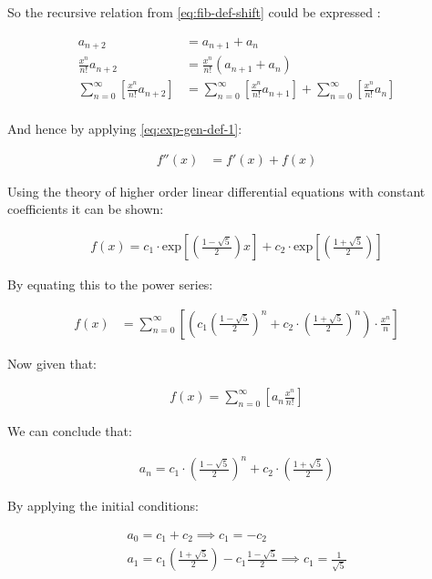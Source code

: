 \documentclass[11pt]{article}
\begin{document}
So the recursive relation from \eqref{eq:fib-def-shift}  could be expressed :


\begin{align*}
a_{n+  2}    &= a_{n+  1} +  a_{n}\\
\frac{x^n}{n!}   a_{n+  2}    &= \frac{x^n}{n!}\left( a_{n+  1} +  a_{n}  \right)\\
\sum^{\infty}_{n= 0} \left[ \frac{x^n}{n!}   a_{n+  2} \right]        &= \sum^{\infty}_{n= 0}   \left[ \frac{x^n}{n!} a_{n+  1} \right]  + \sum^{\infty}_{n= 0}   \left[ \frac{x^n}{n!} a_{n}  \right]  \\
\end{align*}

And hence by applying \eqref{eq:exp-gen-def-1}:

\begin{align}
f''\left( x \right) &= f'\left( x \right)+  f\left( x \right)
\end{align}


Using the theory of higher order linear differential equations with
constant coefficients it can be shown:


\begin{align*}
f\left( x \right)= c_1 \cdot  \mathrm{exp}\left[ \left( \frac{1- \sqrt{5} }{2} \right)x \right] +  c_2 \cdot  \mathrm{exp}\left[ \left( \frac{1 +  \sqrt{5} }{2} \right) \right]
\end{align*}


By equating this to the power series:


\begin{align*}
f\left( x \right)&= \sum^{\infty}_{n= 0}   \left[ \left( c_1\left( \frac{1- \sqrt{5} }{2} \right)^n +  c_2 \cdot  \left( \frac{1+ \sqrt{5} }{2} \right)^n \right) \cdot  \frac{x^n}{n} \right]
\end{align*}


Now given that:


\begin{align*}
f\left( x \right)= \sum^{\infty}_{n= 0}   \left[ a_n \frac{x^n}{n!} \right]
\end{align*}


We can conclude that:


\begin{align*}
a_n = c_1\cdot  \left( \frac{1- \sqrt{5} }{2} \right)^n +  c_2 \cdot  \left( \frac{1+  \sqrt{5} }{2} \right)
\end{align*}


By applying the initial conditions:


\begin{align*}
a_0= c_1 +  c_2  \implies  c_1= - c_2\\
a_1= c_1 \left( \frac{1+ \sqrt{5} }{2} \right) -  c_1 \frac{1-\sqrt{5} }{2}  \implies  c_1 = \frac{1}{\sqrt{5} }
\end{align*}
\end{document}
